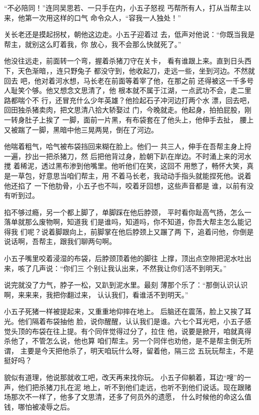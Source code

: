 “不必陪同！”连同吴思若、一只手在内，小五子怒视
丐帮所有人，打从当帮主以来，他第一次用这样的口气
命令众人，“容我一人独处！”

关长老还是摸起拐杖，朝他这边走。小五子迎着过
去，低声对他说：“你既当我是帮主，就别这么盯着我，你
放心，我不会那么快就死了。”

他没往远走，前面转一个弯，握着杀猪刀守在关卡，
看有谁跟上来。直到日头西下，天色渐暗，，连只野兔子
都没守到，他收起刀，走远一些，坐到河边。不然就回去
吧，他对着河水想，马长老在前面等着宰了他，在那之前
还得被这一千多号人耻笑个够。他又想念文思清了，他
根本就不属于江湖，一点武功不会，走二里路都喘个不
行，还冒充什么少年英雄？他捡起石子冲河边打两个水
漂，回去吧，回田独杀猪卖肉，把文思清八拾大轿娶过
门，今晚就走。他起身，拍拍屁股，刚一转身肚子上挨了
一脚，面前一片黑，有布袋套在了他头上，他伸手去扯，
腰上又被踹了一脚，黑暗中他三晃两晃，倒在了河边。

他喘着粗气，哈气被布袋挡回来糊在脸上。他们一
共三人，伸手在吾帮主身上捋一遍，抄出一把杀猪刀，然
后把他背过身，脸朝下趴在岸边。不时涌上来的河水搅
着稀泥，透过黑布渗到他嘴里。他听他们在笑，这回不
用憋了，畅怀大笑，真是一草包，好意思当咱们帮主，用
不着马长老，我动动手指头就能捏死他。说着他还掐了
一下他肋骨，小五子也不叫，咬着牙回想，这些声音都是
谁，以前有没有听到过。

掐不够过瘾，另一个都上脚了，单脚踩在他后脖颈，
平时看你趾高气扬，怎么一落单就那么废物啊，知道我
们是谁吗，知道吗，你不知道，你吾大帮主怎么能记得我
们呢？说着脚跟向上，前脚掌在他后脖颈上又蹍了两
下，追着问他，你倒是说话啊，吾帮主，跟我们聊两句啊。

小五子嘴里咬着浸湿的布袋，后脖颈顶着他的脚往
上撑，顶出点空隙把泥水吐出来，咳了几声说：“你们三
个别让我认出来，不然我让你们活不到明天。”

说完就没了力气，脖子一松，又趴到泥水里。最刻
薄那个乐了：“那倒认识认识啊，来来来，我把你翻过来，
认认我们，看谁活不到明天。”

小五子死猪一样被提起来，又重重地仰摔在地上。
后脑还在震荡，脸上又挨了耳光。他们隔着布袋抽他
脸，说你醒醒，认认我们是谁。六七个耳光吧，小五子感
觉头顶的布袋在往上提。有个同伴觉得过分了，拉住
他，说要是掀开，咱就真得杀他了，不管怎么说，他也算
咱们帮主。另一个同伴也劝他，是不是帮主倒无所谓，
主要是今天把他杀了，明天咱玩什么呀，留着他，隔三岔
五玩玩帮主，不是挺好吗？

貌似有道理，他说那就收工吧，改天再来找你玩。
小五子仰躺着，耳边“嗖”的一声，他们把杀猪刀扎在泥
地上，听不到他们走远，也听不到他们说话。现在跟赌
场那次不一样了，他多了文思清，还多了何员外的遗愿，
什么时候他的命这么值钱，哪怕被凌辱之后。

